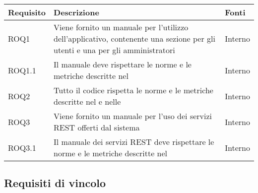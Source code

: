 \begin{center}

	\def\arraystretch{1.5}
	\bgroup
	\begin{longtable}{| p{2.5cm} | p{8cm} | p{2cm} |}

		\hline
		\textbf{Requisito} & \textbf{Descrizione} & \textbf{Fonti} \\
		\hline

		ROQ1  &  Viene fornito un manuale per l'utilizzo dell'applicativo, contenente una sezione per gli utenti e una per gli amministratori  &  Interno \\
		\hline
		ROQ1.1  &  Il manuale deve rispettare le norme e le metriche descritte nel \docNameVersionPdQ  &  Interno \\
		\hline
		ROQ2  &  Tutto il codice rispetta le norme e le metriche descritte nel \docNameVersionPdQ{} e nelle \docNameVersionNdP  &  Interno \\
		\hline
		ROQ3  &  Viene fornito un manuale per l'uso dei servizi REST offerti dal sistema  &  Interno \\
		\hline
		ROQ3.1  &  Il manuale dei servizi REST deve rispettare le norme e le metriche descritte nel \docNameVersionPdQ  &  Interno \\
		\hline


	\end{longtable}
	\egroup
\end{center}

\subsection{Requisiti di vincolo}

